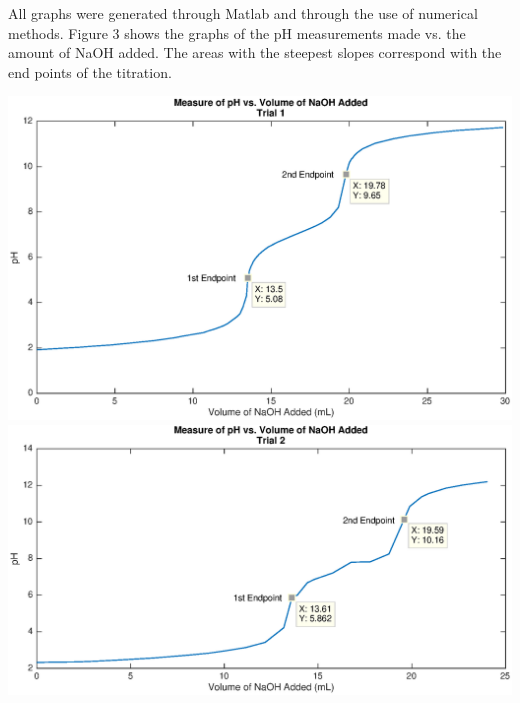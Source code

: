 \documentclass{article}
\begin{document}
All graphs were generated through Matlab and through the use of numerical
methods.
Figure 3 shows the graphs of the pH measurements made vs. the amount of NaOH
added. The areas with the steepest slopes correspond with the end points of the
titration.
\begin{center}
        \includegraphics[scale=0.7]{raw_1}
        \includegraphics[scale=0.7]{raw_2}
\end{center}
\newpage
\end{document}
